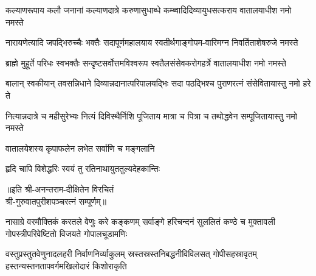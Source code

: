 
\twolineshloka
{कल्याणरूपाय कलौ जनानां कल्याणदात्रे करुणासुधाब्धे}
{कम्ब्वादिदिव्यायुधसत्कराय वातालयाधीश नमो नमस्ते}

\twolineshloka
{नारायणेत्यादि जपद्भिरुच्चैः भक्तैः सदापूर्णमहालयाय}
{स्वतीर्थगाङ्गोपम-वारिमग्न निवर्तिताशेषरुजे नमस्ते}

\twolineshloka
{ब्राह्मे मुहूर्ते परिधः स्वभक्तैः सन्दृष्टसर्वोत्तमविश्वरूप}
{स्वतैलसंसेवकरोगहर्त्रे वातालयाधीश नमो नमस्ते}

\twolineshloka
{बालान् स्वकीयान् तवसन्निधाने दिव्यान्नदानात्परिपालयद्भिः}
{सदा पठद्भिश्च पुराणरत्नं संसेवितायास्तु नमो हरे ते}

\twolineshloka
{नित्यान्नदात्रे च महीसुरेभ्यः नित्यं दिविस्थैर्निशि पूजिताय}
{मात्रा च पित्रा च तथोद्धवेन सम्पूजितायास्तु नमो नमस्ते}

{वातालयेशस्य कृपाफलेन लभेत सर्वाणि च मङ्गलानि}

{हृदि चापि विशेद्धरिः स्वयं तु रतिनाथायुततुल्यदेहकान्तिः}

॥इति श्री-अनन्तराम-दीक्षितेन विरचितं\\ श्री-गुरुवातपुरीशपञ्चरत्नं सम्पूर्णम्‌॥

\closesection
\setlength{\shlokaspaceskip}{6pt}
{नासाग्रे वरमौक्तिकं करतले वेणुः करे कङ्कणम्}
{सर्वाङ्गे हरिचन्दनं सुललितं कण्ठे च मुक्तावली}
{गोपस्त्रीपरिवेष्टितो विजयते गोपालचूडामणिः}

{वस्तुप्रस्तुतवेणुनादलहरी निर्वाणनिर्व्याकुलम्}
{स्रस्तस्रस्तनिबद्धनीविविलसत् गोपीसहस्रावृतम्}
{हस्तन्यस्तनतापवर्गमखिलोदारं किशोराकृति}


\setlength{\shlokaspaceskip}{24pt}